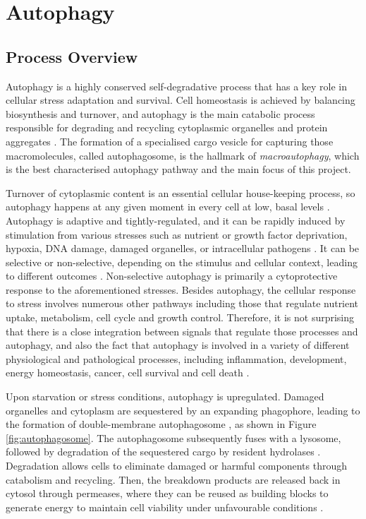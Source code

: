     
    
    
    
    
        
        
        
     \newpage   
    \section{Autophagy}
    
    \subsection{Process Overview}

    Autophagy is a highly conserved self-degradative process that has a key role in cellular stress adaptation and survival. Cell homeostasis is achieved by balancing biosynthesis and turnover, and autophagy is the main catabolic process responsible for degrading and recycling cytoplasmic organelles and protein aggregates \cite{Feng2015}. The formation of a specialised cargo vesicle for capturing those macromolecules, called autophagosome, is the hallmark of \textit{macroautophagy}, which is the best characterised autophagy pathway and the main focus of this project. 

    Turnover of cytoplasmic content is an essential cellular house-keeping process, so autophagy happens at any given moment in every cell at low, basal levels \cite{levine2008autophagy}. Autophagy is adaptive and tightly-regulated, and it can be rapidly induced by stimulation from various stresses such as nutrient or growth factor deprivation, hypoxia, DNA damage, damaged organelles, or intracellular pathogens \cite{Kroemer2010}. It can be selective or non-selective, depending on the stimulus and cellular context, leading to different outcomes \cite{Feng2015}. Non-selective autophagy is primarily a cytoprotective response to the aforementioned stresses. 
    Besides autophagy, the cellular response to stress involves numerous other pathways including those that regulate nutrient uptake, metabolism, cell cycle and growth control. Therefore, it is not surprising that there is a close integration between signals that regulate those processes and autophagy, and also the fact that autophagy is involved in a variety of different physiological and pathological processes, including inflammation, development, energy homeostasis, cancer, cell survival and cell death \cite{levine2008autophagy}.

    Upon starvation or stress conditions, autophagy is upregulated. Damaged organelles and cytoplasm are sequestered by an expanding phagophore, leading to the formation of double-membrane autophagosome \cite{Feng2015}, as shown in Figure \ref{fig:autophagosome}. The autophagosome subsequently fuses with a lysosome, followed by degradation of the sequestered cargo by resident hydrolases \cite{Yorimitsu2005Autophagy:Self-eating}. Degradation allows cells to eliminate damaged or harmful components through catabolism and recycling. Then, the breakdown products are released back in cytosol through permeases, where they can be reused as building blocks to generate energy to maintain cell viability under unfavourable conditions \cite{Feng2013TheMacroautophagy}. 


